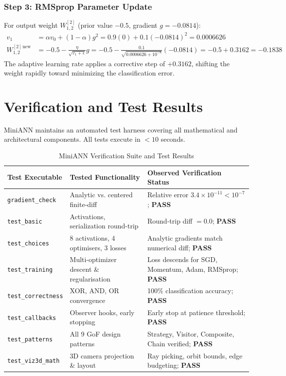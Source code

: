 \documentclass[11pt,a4paper]{article}
\begin{document}
\subsubsection{Step 3: RMSprop Parameter Update}
For output weight $W_{1,2}^{[2]}$ (prior value $-0.5$, gradient $g = -0.0814$):
\begin{align*}
    v_1 &= \alpha v_0 + (1 - \alpha) g^2 = 0.9(0) + 0.1(-0.0814)^2 = 0.0006626 \\
    W_{1,2}^{[2]\,\text{new}} &= -0.5 - \frac{\eta}{\sqrt{v_1 + \epsilon}} g = -0.5 - \frac{0.1}{\sqrt{0.0006626 + 10^{-8}}} (-0.0814) = -0.5 + 0.3162 = -0.1838
\end{align*}
The adaptive learning rate applies a corrective step of $+0.3162$, shifting the weight rapidly toward minimizing the classification error.

\section{Verification and Test Results}

MiniANN maintains an automated test harness covering all mathematical and architectural components. All tests execute in $< 10$ seconds.

\begin{table}[htbp]
\small
\centering
\begin{tabularx}{\textwidth}{l p{4.5cm} X}
\toprule
\textbf{Test Executable} & \textbf{Tested Functionality} & \textbf{Observed Verification Status} \\
\midrule
\texttt{gradient\_check} & Analytic vs. centered finite-diff & Relative error $3.4 \times 10^{-11} < 10^{-7}$; \textbf{PASS} \\
\texttt{test\_basic} & Activations, serialization round-trip & Round-trip diff $= 0.0$; \textbf{PASS} \\
\texttt{test\_choices} & 8 activations, 4 optimisers, 3 losses & Analytic gradients match numerical diff; \textbf{PASS} \\
\texttt{test\_training} & Multi-optimizer descent \& regularisation & Loss descends for SGD, Momentum, Adam, RMSprop; \textbf{PASS} \\
\texttt{test\_correctness} & XOR, AND, OR convergence & 100\% classification accuracy; \textbf{PASS} \\
\texttt{test\_callbacks} & Observer hooks, early stopping & Early stop at patience threshold; \textbf{PASS} \\
\texttt{test\_patterns} & All 9 GoF design patterns & Strategy, Visitor, Composite, Chain verified; \textbf{PASS} \\
\texttt{test\_viz3d\_math} & 3D camera projection \& layout & Ray picking, orbit bounds, edge budgeting; \textbf{PASS} \\
\bottomrule
\end{tabularx}
\caption{MiniANN Verification Suite and Test Results}
\end{table}
\end{document}
